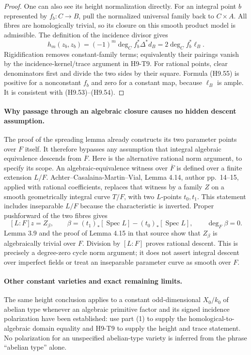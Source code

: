 \documentclass[11pt,a4paper]{article}
\begin{document}
\begin{proof}
One can also see its height normalization directly. For an integral
point $b$ represented by $f_b:C\to B$, pull the normalized universal
family back to $C\times A$. All fibres are homologically trivial,
so its closure on this smooth product model is admissible. The
definition of the incidence divisor gives
\[
 h_m(z_b,z_b)
      =(-1)^m\deg_C f_b^*\Delta^*d_B
      =2\deg_C f_b^*\ell_B.                               \tag{H9.55}
\]
Rigidification removes constant-family terms; equivalently their
pairings vanish by the incidence-kernel/trace argument in H9-T9.
For rational points, clear denominators first and divide the two
sides by their square. Formula (H9.55) is positive for a nonconstant
$f_b$ and zero for a constant map, because $\ell_B$ is ample.
It is consistent with (H9.53)--(H9.54).
\end{proof}

\paragraph{Why passage through an algebraic closure causes no hidden descent assumption.}
The proof of the spreading lemma already constructs its two parameter
points over $F$ itself. It therefore bypasses any assumption that
integral algebraic equivalence descends from $\overline F$.
Here is the alternative rational norm argument, to specify its scope.
An algebraic-equivalence witness over $\overline F$ is defined over
a finite extension $L/F$. Achter--Casalaina-Martin--Vial, Lemma 4.14,
author pp.~14--15, applied with rational coefficients, replaces that
witness by a family $Z$ on a smooth geometrically integral curve
$T/F$, with two $L$-points $t_0,t_1$. This statement includes
inseparable $L/F$ because the characteristic is inverted. Proper
pushforward of the two fibres gives
\[
 [L:F]z
  =Z_{\beta},\qquad
 \beta=(t_1)_*[\operatorname{Spec}L]
            -(t_0)_*[\operatorname{Spec}L],\qquad
 \deg_F\beta=0.
\]
Lemma 3.9 and the proof of Lemma 4.15 in that source show that
$Z_\beta$ is algebraically trivial over $F$. Division by $[L:F]$
proves rational descent. This is precisely a degree-zero cycle
norm argument; it does not assert integral descent over imperfect
fields or treat an inseparable parameter curve as smooth over $F$.

\paragraph{Other constant varieties and exact remaining limits.}
The same height conclusion applies to a constant odd-dimensional
$X_0/k_0$ of abelian type whenever an algebraic primitive factor and
its signed incidence polarization have been established: use part (1)
to supply the homological-to-algebraic domain equality and H9-T9 to
supply the height and trace statement. No polarization for an
unspecified abelian-type variety is inferred from the phrase
``abelian type'' alone.
\end{document}
